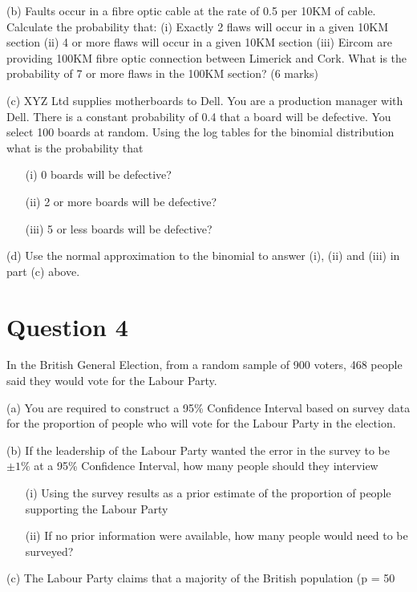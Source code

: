\begin{itemize}
(b)	Faults occur in a fibre optic cable at the rate of 0.5 per 10KM of cable.  Calculate the probability that:
	(i) Exactly 2 flaws will occur in a given 10KM section
	(ii) 4 or more flaws will occur in a given 10KM section
(iii)	Eircom are providing 100KM fibre optic connection between Limerick and Cork.  What is the probability of 7 or more flaws in the 100KM section?					
											(6 marks)


(c)	XYZ Ltd supplies motherboards to Dell.  You are a production manager with Dell.  There is a constant probability of 0.4 that a board will be defective.  You select 100 boards at random.  Using the log tables for the binomial distribution what is the probability that

\begin{itemize}
\item[(i)] 0 boards will be defective?
\item[(ii)] 2 or more boards will be defective?
\item[(iii)]	5 or less boards will be defective?
\end{itemize}
(d)	Use the normal approximation to the binomial to answer (i), (ii) and (iii) in part (c) above.


\section{Question 4}
In the British General Election, from a random sample of 900 voters, 468 people said they would vote for the Labour Party.  

(a) 	You are required to construct a 95\% Confidence Interval based on survey data for the proportion of people who will vote for the Labour Party in the election.

(b)	If the leadership of the Labour Party wanted the error in the survey to be $\pm 1\%$ at a 95\% Confidence Interval, how many people should they interview

\begin{itemize}
\item[(i)]	Using the survey results as a prior estimate of the proportion of people supporting the Labour Party
\item[(ii)]	If no prior information were available, how many people would need to be surveyed?
\end{itemize}
(c)	The Labour Party claims that a majority of the British population (p = 50%
 

\end{itemize}
